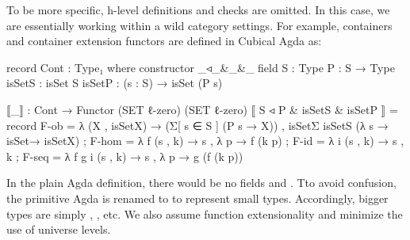 To be more specific, h-level definitions and checks are omitted. In this case, we are essentially working within a wild category settings. For example, containers and container extension functors are defined in Cubical Agda as:

\begin{code}
record Cont : Type₁ where
  constructor _◃_&_&_
  field
    S : Type
    P : S → Type
    isSetS : isSet S
    isSetP : (s : S) → isSet (P s)

⟦_⟧ : Cont → Functor (SET ℓ-zero) (SET ℓ-zero)
⟦ S ◃ P & isSetS & isSetP ⟧
  = record
  { F-ob = λ (X , isSetX) → 
    (Σ[ s ∈ S ] (P s → X)) , isSetΣ isSetS (λ s → isSet→ isSetX)
  ; F-hom = λ f (s , k) → s , λ p → f (k p)
  ; F-id = λ i (s , k) → s , k
  ; F-seq = λ f g i (s , k) → s , λ p → g (f (k p))
  }
\end{code}

In the plain Agda definition, there would be no fields  and . Tto avoid confusion, the primitive Agda  is renamed to  to represent small types. Accordingly, bigger types are simply , , etc. We also assume function extensionality and minimize the use of universe levels.